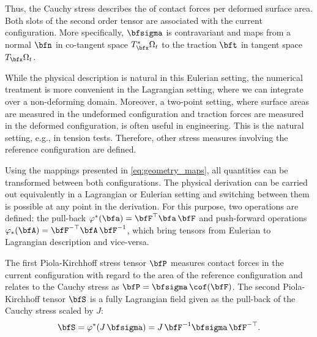 Thus, the Cauchy stress describes the  of contact forces per deformed surface area. Both slots of the second order tensor are associated with the current configuration. More specifically, $\bfsigma$ is contravariant and maps from a normal $\bfn$ in co-tangent space $T^\ast_\bfx\Omega_t$ to the traction $\bft$ in tangent space $T_\bfx\Omega_t$. 

While the physical description is natural in this Eulerian setting, the numerical treatment is more convenient in the Lagrangian setting, where we can integrate over a non-deforming domain. 
Moreover, a two-point setting, where surface areas are measured in the undeformed configuration and traction forces are measured in the deformed configuration, is often useful in engineering. This is the natural setting, e.g., in tension tests. Therefore, other stress measures involving the reference configuration are defined.

Using the mappings presented in \cref{eq:geometry_maps}, all quantities can be transformed between both configurations. 
The physical derivation can be carried out equivalently in a Lagrangian or Eulerian setting and switching between them is possible at any point in the derivation. For this purpose, two operations are defined: the pull-back $\varphi^\ast(\bfa) = \bfF^\top\bfa\,\bfF$ and push-forward operations $\varphi_\ast(\bfA) = \bfF^{-\top}\bfA\,\bfF^{-1}$, which bring tensors from Eulerian to Lagrangian description and vice-versa.

The first Piola-Kirchhoff stress tensor $\bfP$ measures contact forces in the current configuration with regard to the area of the reference configuration and relates to the Cauchy stress as $\bfP = \bfsigma\,\cof(\bfF)$. The second Piola-Kirchhoff tensor $\bfS$ is a fully Lagrangian field given as the pull-back of the Cauchy stress scaled by $J$:%
\begin{align*}
  \bfS = \varphi^\ast(J\,\bfsigma) = J\,\bfF^{-1}\bfsigma\,\bfF^{-\top}.
\end{align*}

